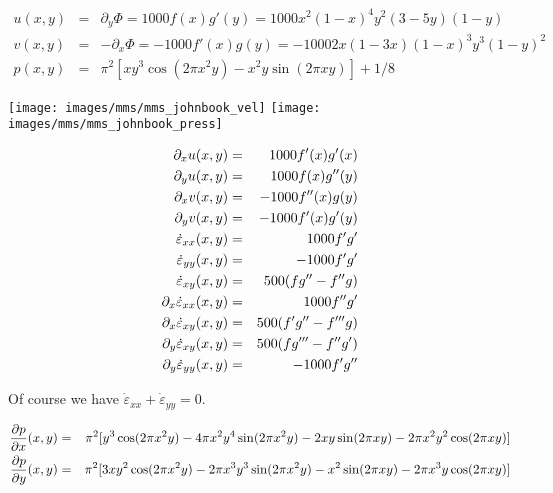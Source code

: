 \begin{eqnarray}
u(x,y) 
&=& \partial_y \Phi 
= 1000 f(x) g'(y) = 1000 x^2(1-x)^4  y^2 (3-5y) (1-y) \\
v(x,y) &=& -\partial_x \Phi 
= -1000 f'(x) g(y)  = -1000 2x(1-3x) (1-x)^3  y^3(1-y)^2   \\
p(x,y) &=& \pi^2 [xy^3 \cos(2\pi x^2 y) - x^2y \sin(2\pi xy) ]+1/8
\end{eqnarray}

\begin{center}
\texttt{[image: images/mms/mms\_johnbook\_vel]}
\texttt{[image: images/mms/mms\_johnbook\_press]}
\end{center}


\begin{eqnarray}
\partial_x u (x,y)&=& 1000f'(x)g'(x)\nonumber\\
\partial_y u (x,y)&=& 1000f(x)g''(y) \nonumber\\
\partial_x v (x,y)&=& -1000f''(x)g(y) \nonumber\\
\partial_y v (x,y)&=& -1000f'(x)g'(y)\nonumber\\
\dot\varepsilon_{xx}(x,y) &=& 1000f'g' \nonumber\\
\dot\varepsilon_{yy}(x,y) &=& -1000f'g' \nonumber\\
\dot\varepsilon_{xy}(x,y) &=&  500( fg'' - f''g )\nonumber\\
\partial_x \dot\varepsilon_{xx} (x,y)&=& 1000f''g'\nonumber\\
\partial_x \dot\varepsilon_{xy} (x,y)&=& 500( f'g'' - f'''g )\nonumber\\
\partial_y \dot\varepsilon_{xy} (x,y)&=& 500( fg''' - f''g' )\nonumber\\
\partial_y \dot\varepsilon_{yy} (x,y)&=&  -1000f'g''\nonumber
\end{eqnarray}

Of course we have $\dot\varepsilon_{xx}+\dot\varepsilon_{yy}=0$.

\begin{eqnarray}
\frac{\partial p}{\partial x} (x,y)
&=& \pi^2 [ y^3 \cos(2\pi x^2 y) -4\pi x^2y^4  \sin(2\pi x^2 y) -2xy \sin(2\pi x y) -2 \pi x^2 y^2 \cos(2\pi x y)  ]\nonumber\\
\frac{\partial p}{\partial y} (x,y)
&=& \pi^2 [3xy^2 \cos(2\pi x^2 y) -2\pi x^3y^3\sin(2\pi x^2 y)
-x^2 \sin(2\pi x y) -2\pi x^3 y \cos(2\pi x y) ]
\nonumber
\end{eqnarray}


